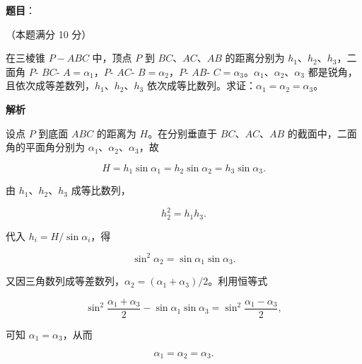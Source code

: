 \begin{answer}

\textbf{题目}：

（本题满分 10 分）

在三棱锥 $P-ABC$ 中，顶点 $P$ 到 $BC\text{、}AC\text{、}AB$ 的距离分别为 $h_1\text{、}h_2\text{、}h_3$，二面角 $P$- $BC$- $A=\alpha_1$，$P$- $AC$- $B=\alpha_2$，$P$- $AB$- $C=\alpha_3$。$\alpha_1\text{、}\alpha_2\text{、}\alpha_3$ 都是锐角，且依次成等差数列，$h_1\text{、}h_2\text{、}h_3$ 依次成等比数列。求证：$\alpha_1=\alpha_2=\alpha_3$。

\textbf{解析}

设点 $P$ 到底面 $ABC$ 的距离为 $H$。在分别垂直于 $BC\text{、}AC\text{、}AB$ 的截面中，二面角的平面角分别为 $\alpha_1\text{、}\alpha_2\text{、}\alpha_3$，故

\nopagebreak[4]
\[
H=h_1\sin\alpha_1=h_2\sin\alpha_2=h_3\sin\alpha_3.
\]

由 $h_1\text{、}h_2\text{、}h_3$ 成等比数列，

\nopagebreak[4]
\[
h_2^2=h_1h_3.
\]

代入 $h_i=H/\sin\alpha_i$，得

\nopagebreak[4]
\[
\sin^2\alpha_2=\sin\alpha_1\sin\alpha_3.
\]

又因三角数列成等差数列，$\alpha_2=(\alpha_1+\alpha_3)/2$。利用恒等式

\nopagebreak[4]
\[
\sin^2\frac{\alpha_1+\alpha_3}{2}-\sin\alpha_1\sin\alpha_3
=\sin^2\frac{\alpha_1-\alpha_3}{2},
\]

可知 $\alpha_1=\alpha_3$，从而

\nopagebreak[4]
\[
\alpha_1=\alpha_2=\alpha_3.
\]


\end{answer}

